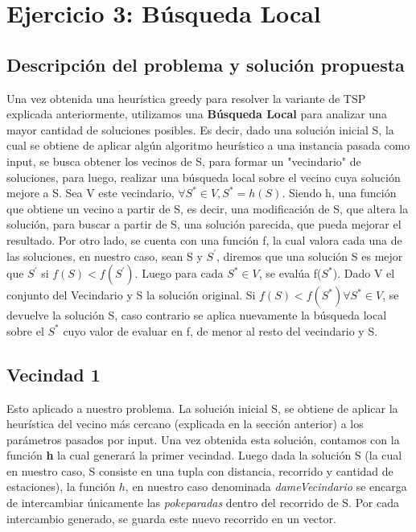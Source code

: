 \section{Ejercicio 3: Búsqueda Local}
    \subsection{Descripción del problema y solución propuesta}
    Una vez obtenida una heurística greedy para resolver la variante de TSP explicada anteriormente, utilizamos una \textbf{Búsqueda Local} para analizar una mayor cantidad de soluciones posibles. Es decir, dado una solución inicial S, la cual se obtiene de aplicar algún algoritmo heurístico a una instancia pasada como input, se busca obtener los vecinos de S, para formar un "vecindario" de soluciones, para luego, realizar una búsqueda local sobre el vecino cuya solución mejore a S. Sea V este vecindario, $\forall S^{*}\in V, S^{*} = h(S)$. Siendo h, una función que obtiene un vecino a partir de S, es decir, una modificación de S, que altera la solución, para buscar a partir de S, una solución parecida, que pueda mejorar el resultado. Por otro lado, se cuenta con una función f, la cual valora cada una de las soluciones, en nuestro caso, sean S y $S^{'}$, diremos que una solución S es mejor que $S^{'}$ si $f(S) < f(S^{'})$. Luego para cada $S^{*}\in V$, se evalúa f($S^{*}$). Dado V el conjunto del Vecindario y S la solución original. Si $f(S)<f(S^{*}) \forall S^{*}\in V$, se devuelve la solución S, caso contrario se aplica nuevamente la búsqueda local sobre el $S^{*}$ cuyo valor de evaluar en f, de menor al resto del vecindario y S.

    \subsection{Vecindad 1}

    \par Esto aplicado a nuestro problema. La solución inicial S, se obtiene de aplicar la heurística del vecino más cercano (explicada en la sección anterior) a los parámetros pasados por input. Una vez obtenida esta solución, contamos con la función \textbf{h} la cual generará la primer vecindad. Luego dada la solución S (la cual en nuestro caso, S consiste en una tupla con distancia, recorrido y cantidad de estaciones), la función $h$, en nuestro caso denominada \emph{dameVecindario} se encarga de intercambiar únicamente las \emph{pokeparadas} dentro del recorrido de S. Por cada intercambio generado, se guarda este nuevo recorrido en un vector.


